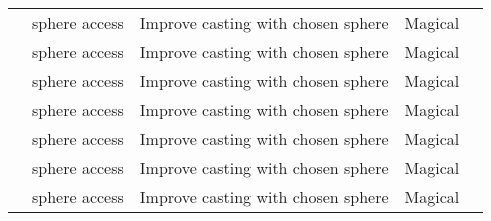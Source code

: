 \begin{longtabuwrapper}
\begin{longtabu}{>{\lcol}p{11em} >{\lcol}p{15em} >{\lcol}X >{\lcol}p{8em} >{\lcol}p{3em}}
               &  sphere access       & Improve casting with chosen sphere & Magical &        \\
          &  sphere access  & Improve casting with chosen sphere & Magical &   \\
           &  sphere access   & Improve casting with chosen sphere & Magical &    \\
          &  sphere access  & Improve casting with chosen sphere & Magical &   \\
           &  sphere access   & Improve casting with chosen sphere & Magical &    \\
          &  sphere access  & Improve casting with chosen sphere & Magical &   \\
          &  sphere access  & Improve casting with chosen sphere & Magical &   \\


\end{longtabu}
\end{longtabuwrapper}
